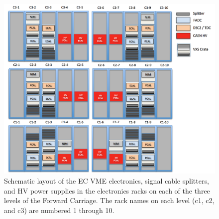 \documentclass[letterpaper,10pt]{article}
\begin{document}
\begin{figure}[htbp]
  \centering
  \includegraphics[width= 7in, keepaspectratio = true]{FC-EC-rack-layout-2}
  \vspace{2mm}
  \caption{Schematic layout of the EC VME electronics, signal cable splitters, and HV power 
  supplies in the electronics racks on each of the three levels of the Forward Carriage. The rack names on each level (c1, c2,
  and c3) are numbered 1 through 10.}
  \label{fc-layout-1} 
\end{figure}
\end{document}

